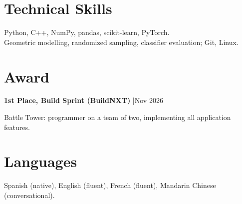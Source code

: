 \documentclass[11pt,a4paper]{article}
\begin{document}
\section{Technical Skills}
Python, C++, NumPy, pandas, scikit-learn, PyTorch.\\[2pt]
Geometric modelling, randomized sampling, classifier evaluation; Git, Linux.
\section{Award}
\textbf{1st Place, Build Sprint (BuildNXT)} \enspace|\enspace Nov 2026\par
Battle Tower: programmer on a team of two, implementing all application features.
\section{Languages}
Spanish (native), English (fluent), French (fluent), Mandarin Chinese (conversational).
\end{document}
